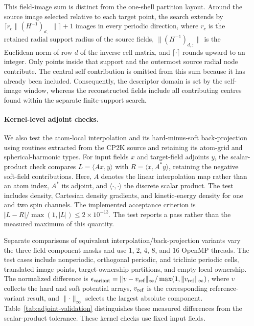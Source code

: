 \documentclass[10pt,a4paper]{article}
\begin{document}
This field-image sum is distinct from the one-shell partition layout. Around the source image selected relative to each target point, the search extends by $\lceil r_c\lVert(H^{-1})_{d,:}\rVert\rceil+1$ images in every periodic direction, where $r_c$ is the retained radial support radius of the source fields, $\lVert(H^{-1})_{d,:}\rVert$ is the Euclidean norm of row $d$ of the inverse cell matrix, and $\lceil\cdot\rceil$ rounds upward to an integer. Only points inside that support and the outermost source radial node contribute. The central self contribution is omitted from this sum because it has already been included. Consequently, the descriptor domain is set by the self-image window, whereas the reconstructed fields include all contributing centres found within the separate finite-support search.


\paragraph{Kernel-level adjoint checks.}
We also test the atom-local interpolation and its hard-minus-soft back-projection using routines extracted from the CP2K source and retaining its atom-grid and spherical-harmonic types. For input fields $x$ and target-field adjoints $y$, the scalar-product check compares $L=\langle Ax,y\rangle$ with $R=\langle x,A^*y\rangle$, retaining the negative soft-field contributions. Here, $A$ denotes the linear interpolation map rather than an atom index, $A^*$ its adjoint, and $\langle\cdot,\cdot\rangle$ the discrete scalar product. The test includes density, Cartesian density gradients, and kinetic-energy density for one and two spin channels. The implemented acceptance criterion is $|L-R|/\max(1,|L|)\leq2\times10^{-13}$. The test reports a pass rather than the measured maximum of this quantity.

Separate comparisons of equivalent interpolation/back-projection variants vary the three field-component masks and use 1, 2, 4, 8, and 16 OpenMP threads. The test cases include nonperiodic, orthogonal periodic, and triclinic periodic cells, translated image points, target-ownership partitions, and empty local ownership. The normalized difference is $\epsilon_{\rm variant}=\lVert v-v_{\rm ref}\rVert_\infty/\max(1,\lVert v_{\rm ref}\rVert_\infty)$, where $v$ collects the hard and soft potential arrays, $v_{\rm ref}$ is the corresponding reference-variant result, and $\lVert\cdot\rVert_\infty$ selects the largest absolute component. Table~\ref{tab:adjoint-validation} distinguishes these measured differences from the scalar-product tolerance. These kernel checks use fixed input fields.
\end{document}
